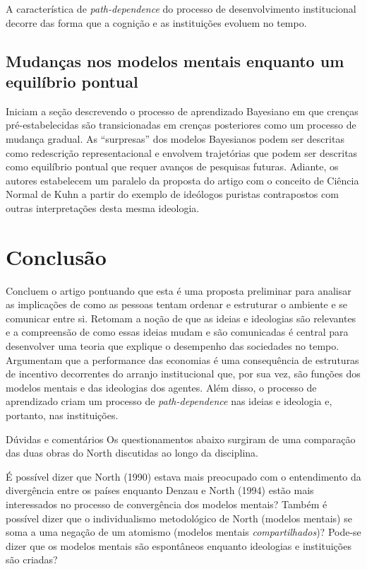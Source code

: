 \documentclass[11pt,lineno]{../style}
\newcommand{\autor}{Denzau e North (1994) }
\begin{document}
A característica de \textit{path-dependence} do processo de desenvolvimento institucional decorre das forma que a cognição e as instituições evoluem no tempo.

\subsection{Mudanças nos modelos mentais enquanto um equilíbrio pontual}

Iniciam a seção descrevendo o processo de aprendizado Bayesiano em que crenças pré-estabelecidas são transicionadas em crenças posteriores como um processo de mudança gradual. As ``surpresas'' dos modelos Bayesianos podem ser descritas como redescrição representacional e envolvem trajetórias que podem ser descritas como equilíbrio pontual que requer avanços de pesquisas futuras. Adiante, os autores estabelecem um paralelo da proposta do artigo com o conceito de Ciência Normal de Kuhn a partir do exemplo de ideólogos puristas contrapostos com outras interpretações desta mesma ideologia.

\section{Conclusão}

Concluem o artigo pontuando que esta é uma proposta preliminar para analisar as implicações de como as pessoas tentam ordenar e estruturar o ambiente e se comunicar entre si. Retomam a noção de que as ideias e ideologias são relevantes e a compreensão de como essas ideias mudam e são comunicadas é central para desenvolver uma teoria que explique o desempenho das sociedades no tempo. Argumentam que a performance das economias é uma consequência de estruturas de incentivo decorrentes do arranjo institucional que, por sua vez, são funções dos modelos mentais e das ideologias dos agentes. Além disso, o processo de aprendizado criam um processo de \textit{path-dependence} nas ideias e ideologia e, portanto, nas instituições.

\begin{redbox}{Dúvidas e comentários}
	Os questionamentos abaixo surgiram de uma comparação das duas obras do North discutidas ao longo da disciplina.
	
	É possível dizer que North (1990) estava mais preocupado com o entendimento da divergência entre os países enquanto \autor estão mais interessados no processo de convergência dos modelos mentais? Também é possível dizer que o individualismo metodológico de North (modelos mentais) se soma a uma negação de um atomismo (modelos mentais \textit{compartilhados})? Pode-se dizer que os modelos mentais são espontâneos enquanto ideologias e instituições são criadas?
\end{redbox}
\end{document}
